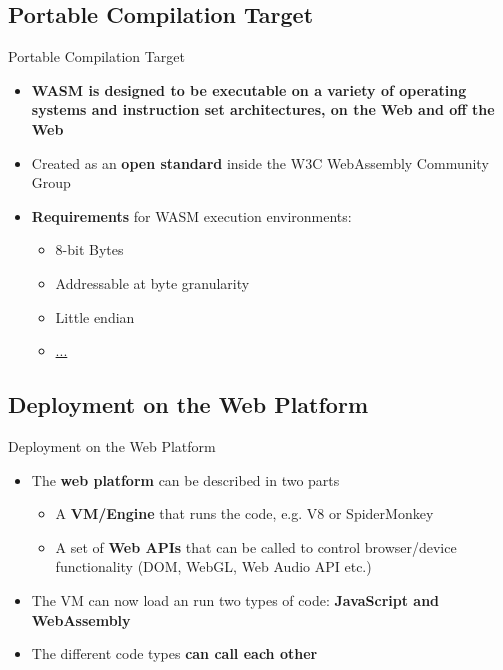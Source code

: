\documentclass{beamer}
\begin{document}
\subsection{Portable Compilation Target}

\begin{frame}{Portable Compilation Target}
    \begin{itemize}
        \item \textbf{WASM is designed to be executable on a variety of operating systems and instruction set architectures, on the Web and off the Web}
        \item Created as an \textbf{open standard} inside the W3C WebAssembly Community Group
        \item \textbf{Requirements} for WASM execution environments:
              \begin{itemize}
                  \item 8-bit Bytes
                  \item Addressable at byte granularity
                  \item Little endian
                  \item \href{https://webassembly.org/docs/portability/}{...}
              \end{itemize}
    \end{itemize}
\end{frame}

\subsection{Deployment on the Web Platform}

\begin{frame}{Deployment on the Web Platform}
    \begin{itemize}
        \item The \textbf{web platform} can be described in two parts
              \begin{itemize}
                  \item A \textbf{VM/Engine} that runs the code, e.g. V8 or SpiderMonkey
                  \item A set of \textbf{Web APIs} that can be called to control browser/device functionality (DOM, WebGL, Web Audio API etc.)
              \end{itemize}
        \item The VM can now load an run two types of code: \textbf{JavaScript and WebAssembly}
        \item The different code types \textbf{can call each other}
    \end{itemize}
\end{frame}
\end{document}
